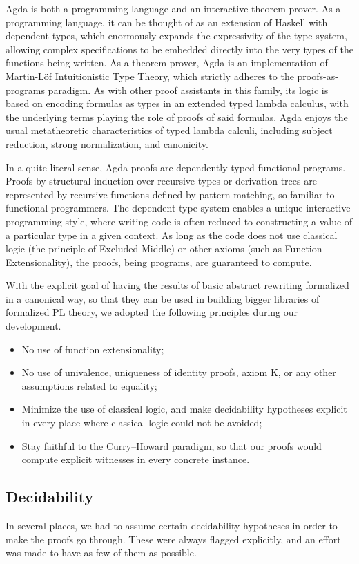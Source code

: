 Agda is both a programming language and an interactive theorem prover.
As a programming language, it can be thought of as an extension of Haskell
with dependent types, which enormously expands the expressivity of the type system,
allowing complex specifications to be embedded directly into the
very types of the functions being written.
As a theorem prover, Agda is an implementation of Martin-L\"of
Intuitionistic Type Theory, which strictly adheres to the proofs-as-programs paradigm.
As with other proof assistants in this family, its logic is based on encoding
formulas as types in an extended typed lambda calculus, with the underlying terms
playing the role of proofs of said formulas. Agda enjoys the usual metatheoretic characteristics
of typed lambda calculi, including subject reduction, strong normalization, and canonicity.

In a quite literal sense, Agda proofs are dependently-typed functional programs.
Proofs by structural induction over recursive types or derivation trees are represented by
recursive functions defined by pattern-matching, so familiar to functional programmers.
The dependent type system enables a unique interactive programming style, where
writing code is often reduced to constructing a value of a particular type in a given context. As long as the code does not use classical logic (the principle of Excluded Middle) or
other axioms (such as Function Extensionality), the proofs, being programs,
are guaranteed to compute. %

With the explicit goal of having the results of basic abstract rewriting
formalized in a canonical way, so that they can be used in building bigger
libraries of formalized PL theory, we adopted the following
principles during our development.
\begin{itemize}
  \item No use of function extensionality;
  \item No use of univalence, uniqueness of identity proofs, axiom K, or any other
  assumptions related to equality;
  \item Minimize the use of classical logic, and make decidability hypotheses explicit in every place where classical logic could not be avoided;
  \item Stay faithful to the Curry--Howard paradigm, so that our proofs would compute
    explicit witnesses in every concrete instance.
\end{itemize}

\subsection{Decidability}
In several places, we had to assume certain decidability hypotheses in order to make
the proofs go through.  These were always flagged explicitly, and an effort was made to
have as few of them as possible.

